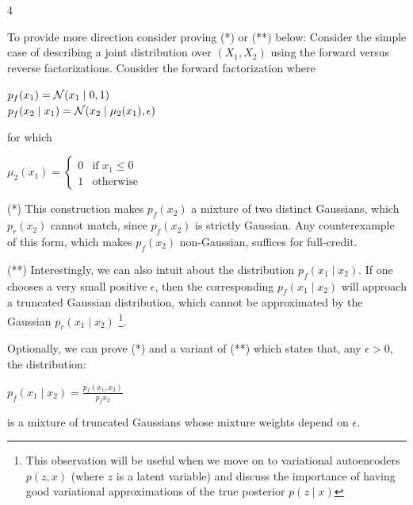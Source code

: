 \clearpage

\LARGE
4
\normalsize

\begin{answer}
    To provide more direction consider proving (*) or (**) below:
    Consider the simple case of describing a joint distribution over $(X_1,X_2)$ using 
    the forward versus reverse factorizations. Consider the forward factorization where

    \begin{center}
        $p_f(x_1) = \mathcal{N}(x_1 \mid 0,1)$ \\
        $p_f(x_2 \mid x_1) = \mathcal{N}(x_2 \mid \mu_2(x_1), \epsilon)$
    \end{center}

    for which

    \begin{center}
        $
        \mu_2(x_1) = 
        \begin{cases}
            0 & \text{if } x_1 \le 0 \\
            1 & \text{otherwise}
        \end{cases}
        $
    \end{center}

    (*) This construction makes $p_f(x_2)$ a mixture of two distinct Gaussians, which $p_r(x_2)$ cannot match, since $p_f(x_2)$ is 
    strictly Gaussian. Any counterexample of this form, which makes $p_f(x_2)$ non-Gaussian, suffices for full-credit.

    (**) Interestingly, we can also intuit about the distribution $p_f(x_1 \mid x_2)$. If one chooses a very small positive $\epsilon$, then the 
    corresponding $p_f(x_1 \mid x_2)$ will approach a truncated Gaussian distribution, which cannot be approximated by the Gaussian $p_r(x_1 \mid x_2)$
    \footnote{This observation will be useful when we move on to variational autoencoders $p(z,x)$ (where $z$ is a latent variable) and discuss the 
    importance of having good variational approximations of the true posterior $p(z \mid x)$}.

    Optionally, we can prove (*) and a variant of (**) which states that, any $\epsilon > 0$, the distribution:

    \begin{center}
        $p_f(x_1 \mid x_2) = \frac{p_f(x_1,x_2)}{p_f{x_2}}$
    \end{center}

    is a mixture of truncated Gaussians whose mixture weights depend on $\epsilon$.


\end{answer}
